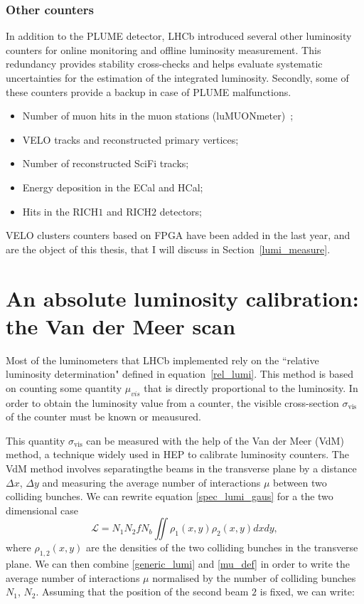 \subsubsection{Other counters} 
In addition to the PLUME detector, LHCb introduced several other luminosity counters for online monitoring and offline luminosity measurement. This redundancy provides stability cross-checks and helps evaluate systematic uncertainties for the estimation of the integrated luminosity.
Secondly, some of these counters provide a backup in case of PLUME malfunctions.
\begin{itemize}
   \item Number of muon hits in the muon stations (luMUONmeter)~\cite{Albicocco:2812716};
   \item VELO tracks and reconstructed primary vertices;
   \item Number of reconstructed SciFi tracks;
   \item Energy deposition in the ECal and HCal;
    \item Hits in the RICH$1$ and RICH$2$ detectors;

\end{itemize}
 VELO clusters counters based on FPGA have been added in the last year, and are the object of this thesis, that I will discuss in Section~\ref{lumi_measure}.

\section{An absolute luminosity calibration: the Van der Meer scan}
Most of the luminometers that LHCb implemented rely on the ``relative luminosity determination" defined in equation~\eqref{rel_lumi}. This method is based on counting some quantity $\mu_{vis}$ that is directly proportional to the luminosity. In order to obtain the luminosity value from a counter, the visible cross-section $\sigma_{\text{vis}}$ of the counter must be known or meausured.

This quantity $\sigma_{\text{vis}}$ can be measured with the help of the Van der Meer (VdM) method, a technique widely used in HEP to calibrate luminosity counters. The VdM method involves separatingthe beams in the transverse plane by a distance $\Delta x$, $\Delta y$ and measuring the average number of interactions $\mu$ between two colliding bunches. 
We can rewrite equation \eqref{spec_lumi_gaus} for a the two dimensional case
\begin{equation}
    \mathcal{L} = N_1 N_2 f N_b\iint \rho_1(x,y) \rho_2(x,y) dxdy,\label{generic_lumi}
\end{equation}
where $\rho_{1,2}(x,y)$ are the densities of the two colliding bunches in the transverse plane.
We can then combine \eqref{generic_lumi} and \eqref{mu_def} in order to write the average number of interactions $\mu$ normalised by the number of colliding bunches $N_1$, $N_2$. Assuming that the position of the second beam $2$ is fixed, we can write:

